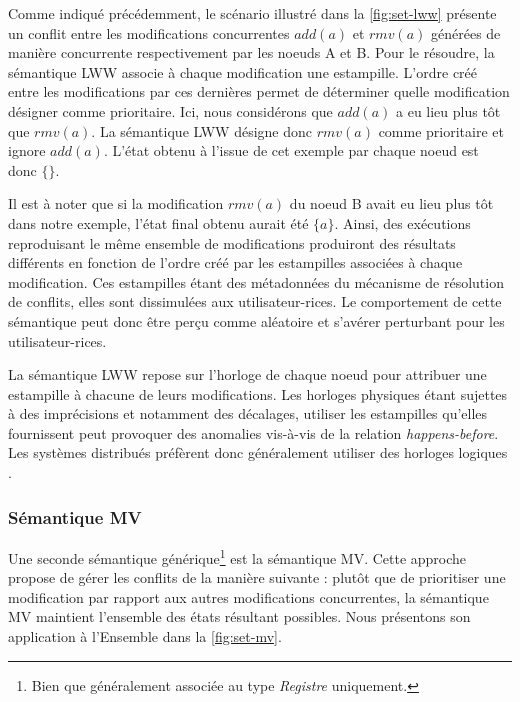 \documentclass[12pt]{thesul}
\newcommand{\hb}{\emph{happens-before}\xspace}
\newcommand{\trm}[1]{\mathit{#1}}
\begin{document}
Comme indiqué précédemment, le scénario illustré dans la \autoref{fig:set-lww} présente un conflit entre les modifications concurrentes $\trm{add}(a)$ et $\trm{rmv}(a)$ générées de manière concurrente respectivement par les noeuds A et B.
Pour le résoudre, la sémantique \ac{LWW} associe à chaque modification une estampille.
L'ordre créé entre les modifications par ces dernières permet de déterminer quelle modification désigner comme prioritaire.
Ici, nous considérons que $\trm{add}(a)$ a eu lieu plus tôt que $\trm{rmv}(a)$.
La sémantique \ac{LWW} désigne donc $\trm{rmv}(a)$ comme prioritaire et ignore $\trm{add}(a)$.
L'état obtenu à l'issue de cet exemple par chaque noeud est donc $\{\}$.

Il est à noter que si la modification $\trm{rmv}(a)$ du noeud B avait eu lieu plus tôt dans notre exemple, l'état final obtenu aurait été $\{a\}$.
Ainsi, des exécutions reproduisant le même ensemble de modifications produiront des résultats différents en fonction de l'ordre créé par les estampilles associées à chaque modification.
Ces estampilles étant des métadonnées du mécanisme de résolution de conflits, elles sont dissimulées aux utilisateur-rices.
Le comportement de cette sémantique peut donc être perçu comme aléatoire et s'avérer perturbant pour les utilisateur-rices.

La sémantique \ac{LWW} repose sur l'horloge de chaque noeud pour attribuer une estampille à chacune de leurs modifications.
Les horloges physiques étant sujettes à des imprécisions et notamment des décalages, utiliser les estampilles qu'elles fournissent peut provoquer des anomalies vis-à-vis de la relation \hb.
Les systèmes distribués préfèrent donc généralement utiliser des horloges logiques \cite{1978-happen-before-lamport}.

\subsubsection{Sémantique \acl{MV}}

Une seconde sémantique générique\footnote{Bien que généralement associée au type \emph{Registre} uniquement.} est la sémantique \acf{MV}.
Cette approche propose de gérer les conflits de la manière suivante : plutôt que de prioritiser une modification par rapport aux autres modifications concurrentes, la sémantique \ac{MV} maintient l'ensemble des états résultant possibles.
Nous présentons son application à l'Ensemble dans la \autoref{fig:set-mv}.
\end{document}
